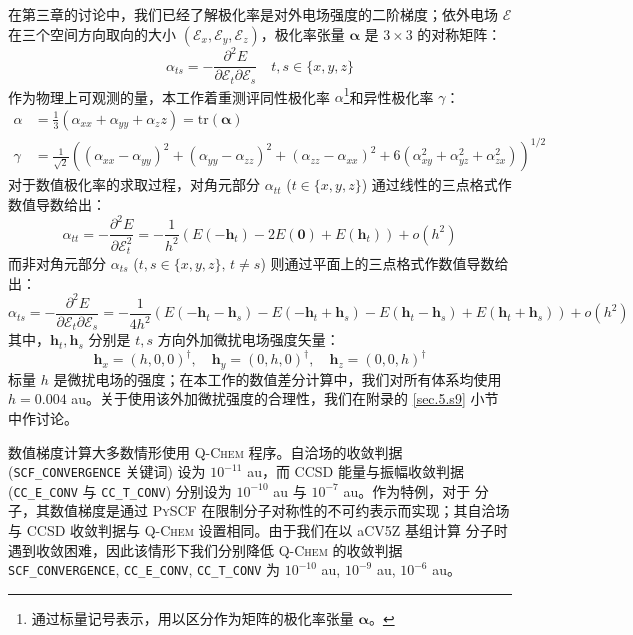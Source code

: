 在\alert{第三章的讨论}中，我们已经了解极化率是对外电场强度的二阶梯度；依外电场 $\pmb{\mathcal{E}}$ 在三个空间方向取向的大小 $(\mathcal{E}_x, \mathcal{E}_y, \mathcal{E}_z)$，极化率张量 $\bm{\alpha}$ 是 $3 \times 3$ 的对称矩阵：
\begin{equation}
    \alpha_{ts} = - \frac{\partial^2 E}{\partial \mathcal{E}_t \partial \mathcal{E}_s} \quad t, s \in \{ x, y, z \}
\end{equation}
作为物理上可观测的量，本工作着重测评同性极化率 $\alpha$\footnote{通过标量记号表示，用以区分作为矩阵的极化率张量 $\bm{\alpha}$。}和异性极化率 $\gamma$：
\begin{align}
    \alpha &= \frac{1}{3} \left( \alpha_{xx} + \alpha_{yy} + \alpha_zz \right) = \mathrm{tr} (\bm{\alpha}) \\
    \gamma &= \frac{1}{\sqrt{2}} \left( (\alpha_{xx} - \alpha_{yy})^2 + (\alpha_{yy} - \alpha_{zz})^2 + (\alpha_{zz} - \alpha_{xx})^2 + 6 (\alpha_{xy}^2 + \alpha_{yz}^2 + \alpha_{zx}^2) \right)^{1/2}
\end{align}
对于数值极化率的求取过程，对角元部分 $\alpha_{tt}$ ($t \in \{ x, y, z \}$) 通过线性的三点格式作数值导数给出：
\begin{equation}
    \label{eq.pol-findiff-alpha-def}
    \alpha_{tt} = - \frac{\partial^2 E}{\partial \mathcal{E}_t^2} = - \frac{1}{h^2} \left( E(- \bm{h}_t) - 2 E(\bm{0}) + E(\bm{h}_t) \right) + o(h^2)
\end{equation}
而非对角元部分 $\alpha_{ts}$ ($t, s \in \{ x, y, z \}, \, t \neq s$) 则通过平面上的三点格式作数值导数给出：
\begin{equation}
    \label{eq.pol-findiff-gamma-def}
    \alpha_{ts} = - \frac{\partial^2 E}{\partial \mathcal{E}_t \partial \mathcal{E}_s} = - \frac{1}{4h^2} \left( E(- \bm{h}_t - \bm{h}_s) - E(- \bm{h}_t + \bm{h}_s) - E(\bm{h}_t - \bm{h}_s) + E(\bm{h}_t + \bm{h}_s) \right) + o(h^2)
\end{equation}
其中，$\bm{h}_t, \bm{h}_s$ 分别是 $t, s$ 方向外加微扰电场强度矢量：
\begin{equation*}
    \bm{h}_x = (h, 0, 0)^\dagger, \quad \bm{h}_y = (0, h, 0)^\dagger, \quad \bm{h}_z = (0, 0, h)^\dagger
\end{equation*}
标量 $h$ 是微扰电场的强度；在本工作的数值差分计算中，我们对所有体系均使用 $h = 0.004$ au。关于使用该外加微扰强度的合理性，我们在附录的 \ref{sec.5.s9} 小节中作讨论。

数值梯度计算大多数情形使用 \textsc{Q-Chem} 程序。自洽场的收敛判据 (\texttt{SCF\_CONVERGENCE} 关键词) 设为 $10^{-11}$ au，而 CCSD 能量与振幅收敛判据 (\texttt{CC\_E\_CONV} 与 \texttt{CC\_T\_CONV}) 分别设为 $10^{-10}$ au 与 $10^{-7}$ au。作为特例，对于  分子，其数值梯度是通过 \textsc{PySCF} 在限制分子对称性的不可约表示而实现；其自洽场与 CCSD 收敛判据与 \textsc{Q-Chem} 设置相同。由于我们在以 aCV5Z 基组计算  分子时遇到收敛困难，因此该情形下我们分别降低 \textsc{Q-Chem} 的收敛判据 \texttt{SCF\_CONVERGENCE}, \texttt{CC\_E\_CONV}, \texttt{CC\_T\_CONV} 为 $10^{-10}$ au, $10^{-9}$ au, $10^{-6}$ au。

